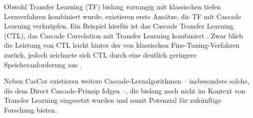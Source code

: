 Obwohl Transfer Learning (TF) bislang vorrangig mit klassischen tiefen Lernverfahren kombiniert wurde, existieren erste Ansätze, die TF mit 
Cascade Learning verknüpfen. Ein Beispiel hierfür ist das Cascade Transfer Learning (CTL), das Cascade Correlation mit Transfer Learning 
kombiniert \cite{phd_deep_cascade}. Zwar blieb die Leistung von CTL leicht hinter der von klassischen Fine-Tuning-Verfahren zurück, jedoch 
zeichnete sich CTL durch eine deutlich geringere Speicheranforderung aus \cite{phd_deep_cascade}.

Neben CasCor existieren weitere Cascade-Lernalgorithmen – insbesondere solche, die dem Direct Cascade-Prinzip folgen –, die bislang noch nicht 
im Kontext von Transfer Learning eingesetzt wurden und somit Potenzial für zukünftige Forschung bieten.
